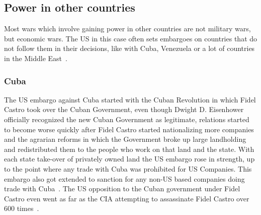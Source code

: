 \subsection{Power in other countries}
Most wars which involve gaining power in other countries are not military wars, but economic wars. The US in this case often sets embargoes on countries that do not follow them in their decisions, like with Cuba, Venezuela or a lot of countries in the Middle East~\cite{us-treasury-embargoes}.
\subsubsection{Cuba}
The US embargo against Cuba started with the Cuban Revolution in which Fidel Castro took over the Cuban Government, even though Dwight D. Eisenhower officially recognized the new Cuban Government as legitimate, relations started to become worse quickly after Fidel Castro started nationalizing more companies and the agrarian reforms in which the Government broke up large landholding and redistributed them to the people who work on that land and the state. With each state take-over of privately owned land the US embargo rose in strength, up to the point where any trade with Cuba was prohibited for US Companies. This embargo also got extended to sanction for any non-US based companies doing trade with Cuba~\cite{cfr-us-cuba-relations}. The US opposition to the Cuban government under Fidel Castro even went as far as the CIA attempting to assassinate Fidel Castro over 600 times~\cite{cnn-fidel-castro-assassination}.

